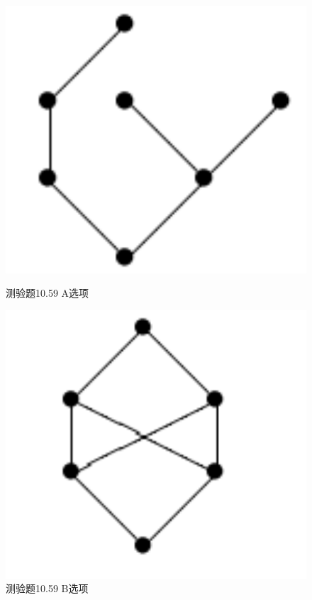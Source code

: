 \documentclass[UTF8, heading=true]{ctexart}
\begin{document}
\begin{figure}[H]
  \centering
  \begin{minipage}[t]{0.2\textwidth}
      \centering
      \includegraphics[width=1\textwidth]{10.59_1.jpg} %
      \vspace{-0.3cm}
      \caption{测验题10.59 A选项}
  \end{minipage}
  \hspace{0.23\textwidth} %
  \begin{minipage}[t]{0.2\textwidth}
      \centering
      \includegraphics[width=1\textwidth]{10.59_2.jpg} %
      \vspace{-0.3cm}
      \caption{测验题10.59 B选项}
\end{minipage}
\end{figure}
\end{document}
